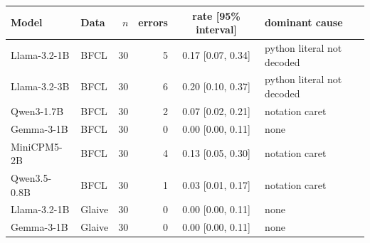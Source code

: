 \begin{tabular}{llrrcl}
\toprule
Model & Data & $n$ & errors & rate [95\% interval] & dominant cause \\
\midrule
Llama-3.2-1B & BFCL & 30 & 5 & 0.17 [0.07, 0.34] & python literal not decoded \\
Llama-3.2-3B & BFCL & 30 & 6 & 0.20 [0.10, 0.37] & python literal not decoded \\
Qwen3-1.7B & BFCL & 30 & 2 & 0.07 [0.02, 0.21] & notation caret \\
Gemma-3-1B & BFCL & 30 & 0 & 0.00 [0.00, 0.11] & none \\
MiniCPM5-2B & BFCL & 30 & 4 & 0.13 [0.05, 0.30] & notation caret \\
Qwen3.5-0.8B & BFCL & 30 & 1 & 0.03 [0.01, 0.17] & notation caret \\
Llama-3.2-1B & Glaive & 30 & 0 & 0.00 [0.00, 0.11] & none \\
Gemma-3-1B & Glaive & 30 & 0 & 0.00 [0.00, 0.11] & none \\
\bottomrule
\end{tabular}
